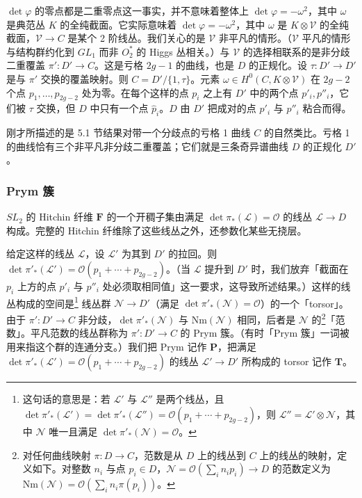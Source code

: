 
$\det\varphi$ 的零点都是二重零点这一事实，并不意味着整体上 $\det\varphi = -\omega^2$，其中 $\omega$ 是典范丛 $K$ 的全纯截面。它实际意味着 $\det\varphi = -\omega^2$，其中 $\omega$ 是 $K\otimes\mathcal{V}$ 的全纯截面，$\mathcal{V}\to C$ 是某个 2 阶线丛。我们关心的是 $\mathcal{V}$ 非平凡的情形。（$\mathcal{V}$ 平凡的情形与结构群约化到 $GL_1$ 而非 $O_2^*$ 的 Higgs 丛相关。）与 $\mathcal{V}$ 的选择相联系的是非分歧二重覆盖 $\pi': D'\to C$。这是亏格 $2g-1$ 的曲线，也是 $D$ 的正规化。设 $\tau: D'\to D'$ 是与 $\pi'$ 交换的覆盖映射。则 $C = D'/\{1,\tau\}$。元素 $\omega\in H^0(C,K\otimes\mathcal{V})$ 在 $2g-2$ 个点 $p_1,\dots,p_{2g-2}$ 处为零。在每个这样的点 $p_i$ 之上有 $D'$ 中的两个点 $p'_i,p''_i$，它们被 $\tau$ 交换，但 $D$ 中只有一个点 $\hat{p}_i$。$D$ 由 $D'$ 把成对的点 $p'_i$ 与 $p''_i$ 粘合而得。

刚才所描述的是 5.1 节结果对带一个分歧点的亏格 1 曲线 $C$ 的自然类比。亏格 1 的曲线恰有三个非平凡非分歧二重覆盖；它们就是三条奇异谱曲线 $D$ 的正规化 $D'$。

\subsubsection{Prym 簇}

$SL_2$ 的 Hitchin 纤维 $\boldsymbol{F}$ 的一个开稠子集由满足 $\det\pi_*(\mathcal{L}) = \mathcal{O}$ 的线丛 $\mathcal{L}\to D$ 构成。完整的 Hitchin 纤维除了这些线丛之外，还参数化某些无挠层。


给定这样的线丛 $\mathcal{L}$，设 $\mathcal{L}'$ 为其到 $D'$ 的拉回。则 $\det\pi'_*(\mathcal{L}') = \mathcal{O}(p_1+\cdots+p_{2g-2})$。（当 $\mathcal{L}$ 提升到 $D'$ 时，我们放弃「截面在 $p_i$ 上方的点 $p'_i$ 与 $p''_i$ 处必须取相同值」这一要求，这导致所述结果。）这样的线丛构成的空间是\footnote{这句话的意思是：若 $\mathcal{L}'$ 与 $\mathcal{L}''$ 是两个线丛，且 $\det\pi'_*(\mathcal{L}') = \det\pi'_*(\mathcal{L}'') = \mathcal{O}(p_1+\cdots+p_{2g-2})$，则 $\mathcal{L}'' = \mathcal{L}'\otimes\mathcal{N}$，其中 $\mathcal{N}$ 唯一且满足 $\det\pi'_*(\mathcal{N}) = \mathcal{O}$。} 线丛群 $\mathcal{N}\to D'$（满足 $\det\pi'_*(\mathcal{N}) = \mathcal{O}$）的一个「torsor」。由于 $\pi': D'\to C$ 非分歧，$\det\pi'_*(\mathcal{N})$ 与 $\mathrm{Nm}(\mathcal{N})$ 相同，后者是 $\mathcal{N}$ 的\footnote{对任何曲线映射 $\pi: D\to C$，范数是从 $D$ 上的线丛到 $C$ 上的线丛的映射，定义如下。对整数 $n_i$ 与点 $p_i\in D$，$\mathcal{N} = \mathcal{O}(\sum_i n_i p_i)\to D$ 的范数定义为 $\mathrm{Nm}(\mathcal{N}) = \mathcal{O}(\sum_i n_i \pi(p_i))$。}「范数」。平凡范数的线丛群称为 $\pi': D'\to C$ 的 Prym 簇。（有时「Prym 簇」一词被用来指这个群的连通分支。）我们把 Prym 记作 $\boldsymbol{P}$，把满足 $\det\pi'_*(\mathcal{L}') = \mathcal{O}(p_1+\cdots+p_{2g-2})$ 的线丛 $\mathcal{L}'\to D'$ 所构成的 torsor 记作 $\boldsymbol{T}$。

